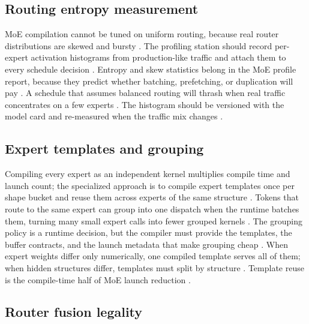 \subsection{Routing entropy measurement}

MoE compilation cannot be tuned on uniform routing, because real router distributions are skewed and bursty \citep{liu2024deepseekv3,patel2025llminference,taxbreak2026}. The profiling station should record per-expert activation histograms from production-like traffic and attach them to every schedule decision \citep{memoryfloor2026,kwon2023vllm,chen2020compilerbasedhardw}. Entropy and skew statistics belong in the MoE profile report, because they predict whether batching, prefetching, or duplication will pay \citep{patel2025llminference,taxbreak2026}. A schedule that assumes balanced routing will thrash when real traffic concentrates on a few experts \citep{liu2024deepseekv3,memoryfloor2026}. The histogram should be versioned with the model card and re-measured when the traffic mix changes \citep{chen2020compilerbasedhardw,patel2025llminference}.

\subsection{Expert templates and grouping}

Compiling every expert as an independent kernel multiplies compile time and launch count; the specialized approach is to compile expert templates once per shape bucket and reuse them across experts of the same structure \citep{liu2024deepseekv3,chen2020compilerbasedhardw,yirage2026}. Tokens that route to the same expert can group into one dispatch when the runtime batches them, turning many small expert calls into fewer grouped kernels \citep{kwon2023vllm,patel2025llminference,taxbreak2026}. The grouping policy is a runtime decision, but the compiler must provide the templates, the buffer contracts, and the launch metadata that make grouping cheap \citep{chen2020compilerbasedhardw,memoryfloor2026}. When expert weights differ only numerically, one compiled template serves all of them; when hidden structures differ, templates must split by structure \citep{liu2024deepseekv3,patel2025llminference}. Template reuse is the compile-time half of MoE launch reduction \citep{chen2020compilerbasedhardw,taxbreak2026}.

\subsection{Router fusion legality}

